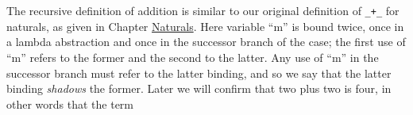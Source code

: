 \begin{fence}
\begin{code}%
\>[0]\AgdaSpace{}%
\AgdaSymbol{:}\AgdaSpace{}%
\<%
\\
\>[0]\AgdaSpace{}%
\AgdaSymbol{=}\AgdaSpace{}%
\AgdaSpace{}%
\AgdaSpace{}%
\<%
\\
%
\\[\AgdaEmptyExtraSkip]%
\>[0]\AgdaSpace{}%
\AgdaSymbol{:}\AgdaSpace{}%
\<%
\\
\>[0]\AgdaSpace{}%
\AgdaSymbol{=}\AgdaSpace{}%
%
\>[100I]\AgdaSpace{}%
\AgdaSpace{}%
\AgdaSpace{}%
\AgdaSpace{}%
\AgdaSpace{}%
\AgdaSpace{}%
\AgdaSpace{}%
\<%
\\
\>[.][@{}l@{}]\<[100I]%
\>[9]\AgdaSpace{}%
\AgdaSpace{}%
\<%
\\
\>[9][@{}l@{\AgdaIndent{0}}]%
\>[11]\AgdaOperator{\AgdaInductiveConstructor{[zero⇒}}\AgdaSpace{}%
\AgdaSpace{}%
\<%
\\
%
\>[11]\AgdaSpace{}%
\AgdaSpace{}%
\AgdaSpace{}%
\AgdaSpace{}%
\AgdaSymbol{(}\AgdaSpace{}%
\AgdaSpace{}%
\AgdaSpace{}%
\AgdaSpace{}%
\AgdaSpace{}%
\AgdaSpace{}%
\AgdaSpace{}%
\AgdaSymbol{)}\AgdaSpace{}%
\AgdaOperator{\AgdaInductiveConstructor{]}}\<%
\end{code}
\end{fence}

The recursive definition of addition is similar to our original
definition of \texttt{\_+\_} for naturals, as given in Chapter
\protect\hyperlink{Naturals-plus}{Naturals}. Here variable ``m'' is
bound twice, once in a lambda abstraction and once in the successor
branch of the case; the first use of ``m'' refers to the former and the
second to the latter. Any use of ``m'' in the successor branch must
refer to the latter binding, and so we say that the latter binding
\emph{shadows} the former. Later we will confirm that two plus two is
four, in other words that the term

